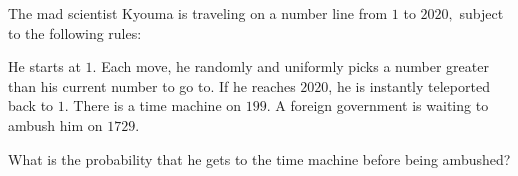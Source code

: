 \documentclass{article}
\begin{document}
\begin{req}[NARML 2020/8]{13}
The mad scientist Kyouma is traveling on a number line from $1$ to $2020,$ subject to the following rules:
\begin{itemize}
\Item He starts at $1.$
\Item Each move, he randomly and uniformly picks a number greater than his current number to go to.
\Item If he reaches $2020$, he is instantly teleported back to $1.$
\Item There is a time machine on $199.$
\Item A foreign government is waiting to ambush him on $1729.$
\end{itemize}
What is the probability that he gets to the time machine before being ambushed?
\end{req}
\end{document}
